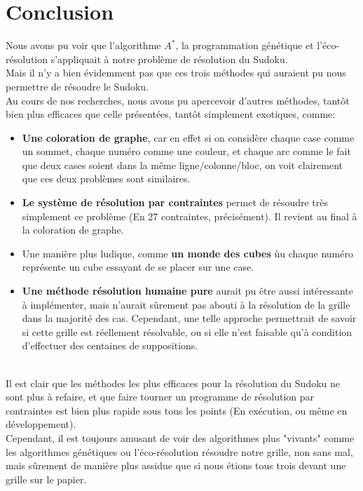 \chapter{Conclusion}
    Nous avons pu voir que l'algorithme $A^{*}$, la programmation génétique et l'éco-résolution s'appliquait à notre problème de résolution du Sudoku. \\

    Mais il n'y a bien évidemment pas que ces trois méthodes qui auraient pu nous permettre de résoudre le Sudoku. \\

    Au cours de nos recherches, nous avons pu apercevoir d'autres méthodes, tantôt bien plus efficaces que celle présentées, tantôt simplement exotiques, comme:
    \begin{itemize}
        \item \textbf{Une coloration de graphe}, car en effet si on considère chaque case comme un sommet, chaque numéro comme une couleur, et chaque arc comme le fait que deux cases soient dans la même ligne/colonne/bloc, on voit clairement que ces deux problèmes sont similaires.
        \item \textbf{Le système de résolution par contraintes} permet de résoudre très simplement ce problème (En 27 contraintes, précisément). Il revient au final à la coloration de graphe.
        \item Une manière plus ludique, comme \textbf{un monde des cubes} ùu chaque numéro représente un cube essayant de se placer sur une case.
        \item \textbf{Une méthode résolution humaine pure} aurait pu être aussi intéressante à implémenter, mais n'aurait sûrement pas abouti à la résolution de la grille dans la majorité des cas. Cependant, une telle approche permettrait de savoir si cette grille est réellement résolvable, ou si elle n'est faisable qu'à condition d'effectuer des centaines de suppositions.
    \end{itemize}~\\

    Il est clair que les méthodes les plus efficaces pour la résolution du Sudoku ne sont plus à refaire, et que faire tourner un programme de résolution par contraintes est bien plus rapide sous tous les points (En exécution, ou même en développement).\\

    Cependant, il est toujours amusant de voir des algorithmes plus "vivants" comme les algorithmes génétiques ou l'éco-résolution résoudre notre grille, non sans mal, mais sûrement de manière plus assidue que si nous étions tous trois devant une grille sur le papier.


